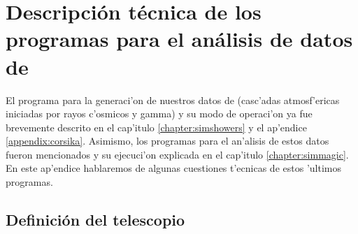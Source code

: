 

\chapter{Descripci\'on t\'ecnica de los programas para el an\'alisis de 
  datos de \MC}
\label{appendix:programs}

El programa para la generaci'on de nuestros datos de \MC (casc'adas
atmosf'ericas iniciadas por rayos c'osmicos y gamma) y su modo de
operaci'on ya fue brevemente descrito en el cap'itulo
\ref{chapter:simshowers} y el ap'endice 
\ref{appendix:corsika}. Asimismo, los programas para el an'alisis de
estos datos fueron mencionados y su ejecuci'on explicada en el
cap'itulo \ref{chapter:simmagic}. En este ap'endice hablaremos de
algunas cuestiones t'ecnicas de estos 'ultimos programas.

\afterpage{\clearpage}


\section{Definici\'on del telescopio}
\label{sec:ctdef}

